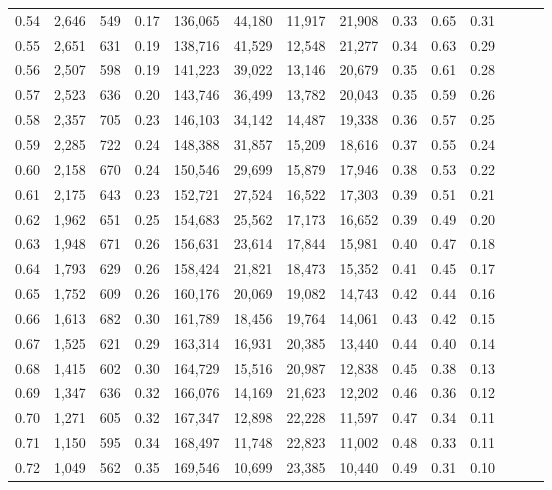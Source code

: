 \begin{tabular}{rrrrrrrrrrrrrr}
0.54 &  2,646 &    549 &  0.17 &  136,065 &   44,180 &  11,917 &  21,908 &  0.33 &  0.65 &      0.31 \\
0.55 &  2,651 &    631 &  0.19 &  138,716 &   41,529 &  12,548 &  21,277 &  0.34 &  0.63 &      0.29 \\
0.56 &  2,507 &    598 &  0.19 &  141,223 &   39,022 &  13,146 &  20,679 &  0.35 &  0.61 &      0.28 \\
0.57 &  2,523 &    636 &  0.20 &  143,746 &   36,499 &  13,782 &  20,043 &  0.35 &  0.59 &      0.26 \\
0.58 &  2,357 &    705 &  0.23 &  146,103 &   34,142 &  14,487 &  19,338 &  0.36 &  0.57 &      0.25 \\
0.59 &  2,285 &    722 &  0.24 &  148,388 &   31,857 &  15,209 &  18,616 &  0.37 &  0.55 &      0.24 \\
0.60 &  2,158 &    670 &  0.24 &  150,546 &   29,699 &  15,879 &  17,946 &  0.38 &  0.53 &      0.22 \\
0.61 &  2,175 &    643 &  0.23 &  152,721 &   27,524 &  16,522 &  17,303 &  0.39 &  0.51 &      0.21 \\
0.62 &  1,962 &    651 &  0.25 &  154,683 &   25,562 &  17,173 &  16,652 &  0.39 &  0.49 &      0.20 \\
0.63 &  1,948 &    671 &  0.26 &  156,631 &   23,614 &  17,844 &  15,981 &  0.40 &  0.47 &      0.18 \\
0.64 &  1,793 &    629 &  0.26 &  158,424 &   21,821 &  18,473 &  15,352 &  0.41 &  0.45 &      0.17 \\
0.65 &  1,752 &    609 &  0.26 &  160,176 &   20,069 &  19,082 &  14,743 &  0.42 &  0.44 &      0.16 \\
0.66 &  1,613 &    682 &  0.30 &  161,789 &   18,456 &  19,764 &  14,061 &  0.43 &  0.42 &      0.15 \\
0.67 &  1,525 &    621 &  0.29 &  163,314 &   16,931 &  20,385 &  13,440 &  0.44 &  0.40 &      0.14 \\
0.68 &  1,415 &    602 &  0.30 &  164,729 &   15,516 &  20,987 &  12,838 &  0.45 &  0.38 &      0.13 \\
0.69 &  1,347 &    636 &  0.32 &  166,076 &   14,169 &  21,623 &  12,202 &  0.46 &  0.36 &      0.12 \\
0.70 &  1,271 &    605 &  0.32 &  167,347 &   12,898 &  22,228 &  11,597 &  0.47 &  0.34 &      0.11 \\
0.71 &  1,150 &    595 &  0.34 &  168,497 &   11,748 &  22,823 &  11,002 &  0.48 &  0.33 &      0.11 \\
0.72 &  1,049 &    562 &  0.35 &  169,546 &   10,699 &  23,385 &  10,440 &  0.49 &  0.31 &      0.10 \\

\end{tabular}
